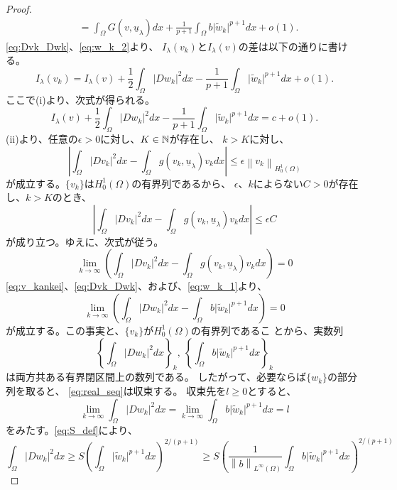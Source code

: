 \begin{proof}
\begin{align}
  &= \int_\Omega G(v, \underline{u}_\lambda) dx + \frac{1}{p+1}
  \int_\Omega b \lvert \tilde{w}_k \rvert^{p+1} dx + o(1). \label{eq:w_k_2}
 \end{align}
 \eqref{eq:Dvk_Dwk}、\eqref{eq:w_k_2}より、
 $I_\lambda(v_k)$と$I_\lambda(v)$の差は以下の通りに書ける。
 \[
  I_\lambda(v_k) = I_\lambda(v) + \frac{1}{2} \int_\Omega \lvert Dw_k
 \rvert^2 dx - \frac{1}{p+1} \int_\Omega \lvert \tilde{w}_k
 \rvert^{p+1} dx + o(1).
 \]
 ここで(i)より、次式が得られる。
 \begin{equation}
  I_\lambda(v) + \frac{1}{2} \int_\Omega \lvert Dw_k
   \rvert^2 dx - \frac{1}{p+1} \int_\Omega \lvert \tilde{w}_k
   \rvert^{p+1} dx = c + o(1). \label{eq:w_k_c}
 \end{equation}
 (ii)より、任意の$\epsilon > 0$に対し、$K \in \mathbb{N}$が存在し、
 $k > K$に対し、
 \[
 \left\lvert \int_\Omega \lvert Dv_k \rvert^2 dx - \int_\Omega g(v_k,
 \underline{u}_\lambda) v_k dx \right\rvert \leq \epsilon \left\| v_k
 \right\|_{H_0^1(\Omega)} 
 \]
 が成立する。$\{ v_k \}$は$H_0^1(\Omega)$の有界列であるから、
 $\epsilon$、$k$によらない$C > 0$が存在し、$k > K$のとき、
 \[
 \left\lvert \int_\Omega \lvert Dv_k \rvert^2 dx - \int_\Omega g(v_k,
 \underline{u}_\lambda) v_k dx \right\rvert \leq \epsilon C
 \]
 が成り立つ。ゆえに、次式が従う。
 \[
 \lim_{k \to \infty} \left( \int_\Omega \lvert Dv_k \rvert^2 dx -
 \int_\Omega g(v_k, \underline{u}_\lambda) v_k dx \right) = 0
 \]
 \eqref{eq:v_kankei}、\eqref{eq:Dvk_Dwk}、および、\eqref{eq:w_k_1}より、
 \[
 \lim_{k \to \infty} \left( \int_\Omega \lvert Dw_k \rvert^2 dx -
 \int_\Omega b \lvert \tilde{w}_k \rvert^{p+1} dx \right) = 0 
 \]
 が成立する。この事実と、$\{ v_k \}$が$H_0^1(\Omega)$の有界列であるこ
 とから、実数列
 \begin{equation}
  \left\{ \int_\Omega \lvert Dw_k \rvert^2 dx \right\}_k , \ 
  \left\{ \int_\Omega b \lvert \tilde{w}_k \rvert^{p+1} dx \right\}_k
  \label{eq:real_seq}
 \end{equation}
 は両方共ある有界閉区間上の数列である。
 したがって、必要ならば$\{ w_k \}$の部分列を取ると、
 \eqref{eq:real_seq}は収束する。
 収束先を$l \geq 0$とすると、
 \[
  \lim_{k \to \infty} \int_\Omega \lvert Dw_k \rvert^2 dx = \lim_{k
 \to \infty} \int_\Omega b \lvert \tilde{w}_k \rvert^{p+1} dx = l
 \]
 をみたす。\eqref{eq:S_def}により、
 \[
  \int_\Omega \lvert Dw_k \rvert^2 dx \geq S \left( \int_\Omega \lvert
 \tilde{w}_k \rvert^{p+1} dx \right)^{2/(p+1)} \geq S \left(
 \frac{1}{\left\| b \right\|_{L^\infty(\Omega)}} \int_\Omega b \lvert
 \tilde{w}_k \rvert^{p+1} dx \right)^{2/(p+1)}
\]
\end{proof}
